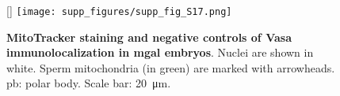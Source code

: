\begin{figure}[ht!]
	[\FBwidth]
	{\texttt{[image: supp\_figures/supp\_fig\_S17.png]}}
	{\caption[\textbf{MitoTracker staining and negative controls of Vasa immunolocalization in \gls{mgal} embryos}]
	{
		\textbf{MitoTracker staining and negative controls of Vasa immunolocalization in \gls{mgal} embryos}. Nuclei are shown in white. Sperm mitochondria (in green) are marked with arrowheads. pb: polar body. Scale bar: \qty{20}{\um}.
	}
	\label{suppFig:immunoBianco}}
\end{figure}

\clearpage

% 